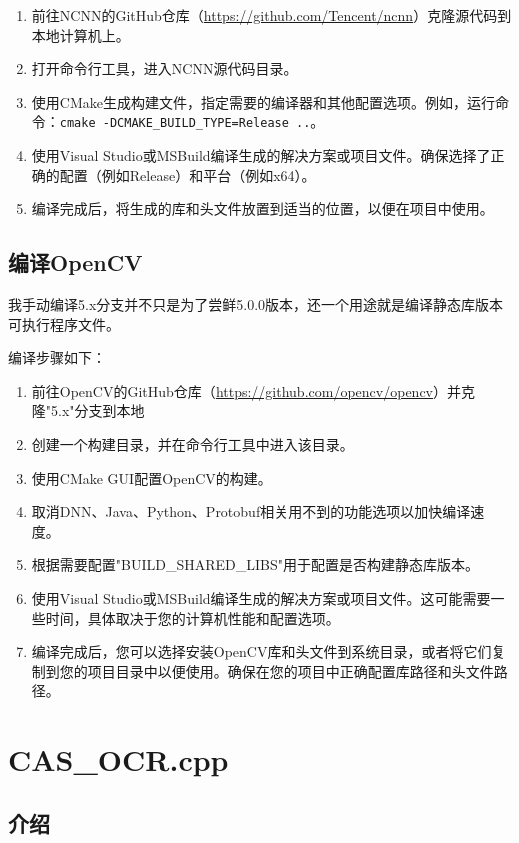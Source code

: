 \begin{enumerate}
	\item 前往NCNN的GitHub仓库（\url{https://github.com/Tencent/ncnn}）克隆源代码到本地计算机上。
	\item 打开命令行工具，进入NCNN源代码目录。
	\item 使用CMake生成构建文件，指定需要的编译器和其他配置选项。例如，运行命令：\texttt{cmake -DCMAKE\_BUILD\_TYPE=Release ..}。
	\item 使用Visual Studio或MSBuild编译生成的解决方案或项目文件。确保选择了正确的配置（例如Release）和平台（例如x64）。
	\item 编译完成后，将生成的库和头文件放置到适当的位置，以便在项目中使用。
\end{enumerate}

\subsection{编译OpenCV}

我手动编译5.x分支并不只是为了尝鲜5.0.0版本，还一个用途就是编译静态库版本可执行程序文件。

编译步骤如下：

\begin{enumerate}
	\item 前往OpenCV的GitHub仓库（\url{https://github.com/opencv/opencv}）并克隆"5.x"分支到本地
	\item 创建一个构建目录，并在命令行工具中进入该目录。
	\item 使用CMake GUI配置OpenCV的构建。
	\item 取消DNN、Java、Python、Protobuf相关用不到的功能选项以加快编译速度。
	\item 根据需要配置"BUILD\_SHARED\_LIBS"用于配置是否构建静态库版本。
	\item 使用Visual Studio或MSBuild编译生成的解决方案或项目文件。这可能需要一些时间，具体取决于您的计算机性能和配置选项。
	\item 编译完成后，您可以选择安装OpenCV库和头文件到系统目录，或者将它们复制到您的项目目录中以便使用。确保在您的项目中正确配置库路径和头文件路径。
\end{enumerate}

\section{CAS\_OCR.cpp}

\subsection{介绍}

